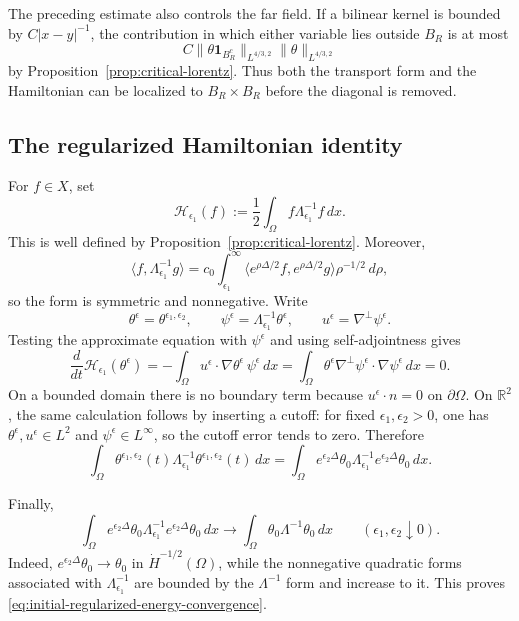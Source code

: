\documentclass[11pt,reqno]{amsproc}
\newcommand{\R}{\mathbb R}
\newcommand{\Om}{\Omega}
\newcommand{\one}{\mathbf 1}
\newcommand{\dd}{\,d}
\newcommand{\Lam}{\Lambda}
\begin{document}
The preceding estimate also controls the far field.  If a
bilinear kernel is bounded by $C|x-y|^{-1}$, the contribution in which either
variable lies outside $B_R$ is at most
\[
 C\|\theta\one_{B_R^c}\|_{L^{4/3,2}}
  \|\theta\|_{L^{4/3,2}}
\]
by Proposition~\ref{prop:critical-lorentz}.  Thus both the transport form and
the Hamiltonian can be localized to $B_R\times B_R$ before the diagonal is
removed.

\subsection{The regularized Hamiltonian identity}

For $f\in X$, set
\[
  \mathcal H_{\epsilon_1}(f)
  :=\frac12\int_\Om f\Lam_{\epsilon_1}^{-1}f\dd x.
\]
This is well defined by Proposition~\ref{prop:critical-lorentz}.  Moreover,
\[
 \langle f,\Lam_{\epsilon_1}^{-1}g\rangle
 =c_0\int_{\epsilon_1}^{\infty}
 \langle e^{\rho\Delta/2}f,e^{\rho\Delta/2}g\rangle
 \rho^{-1/2}\dd\rho,
\]
so the form is symmetric and nonnegative.  Write
\[
 \theta^\epsilon=\theta^{\epsilon_1,\epsilon_2},
 \qquad
 \psi^\epsilon=\Lam_{\epsilon_1}^{-1}\theta^\epsilon,
 \qquad
 u^\epsilon=\nabla^\perp\psi^\epsilon.
\]
Testing the approximate equation with $\psi^\epsilon$ and using
self-adjointness gives
\[
 \frac{d}{dt}\mathcal H_{\epsilon_1}(\theta^\epsilon)
 =-\int_\Om u^\epsilon\cdot\nabla\theta^\epsilon\,\psi^\epsilon\dd x
 =\int_\Om\theta^\epsilon
 \nabla^\perp\psi^\epsilon\cdot\nabla\psi^\epsilon\dd x=0.
\]
On a bounded domain there is no boundary term because
$u^\epsilon\cdot n=0$ on $\partial\Om$.  On $\R^2$, the same calculation
follows by inserting a cutoff: for fixed
$\epsilon_1,\epsilon_2>0$, one has
$\theta^\epsilon,u^\epsilon\in L^2$ and $\psi^\epsilon\in L^\infty$, so the
cutoff error tends to zero.  Therefore
\begin{equation}\label{eq:regularized-energy}
 \int_\Omega\theta^{\epsilon_1,\epsilon_2}(t)
 \Lam_{\epsilon_1}^{-1}\theta^{\epsilon_1,\epsilon_2}(t)\dd x
 =\int_\Omega e^{\epsilon_2\Delta}\theta_0
 \Lam_{\epsilon_1}^{-1}e^{\epsilon_2\Delta}\theta_0\dd x.
\end{equation}

Finally,
\begin{equation}\label{eq:initial-regularized-energy-convergence}
 \int_\Om e^{\epsilon_2\Delta}\theta_0
 \Lam_{\epsilon_1}^{-1}e^{\epsilon_2\Delta}\theta_0\dd x
 \longrightarrow
 \int_\Om\theta_0\Lam^{-1}\theta_0\dd x
 \qquad (\epsilon_1,\epsilon_2\downarrow0).
\end{equation}
Indeed, $e^{\epsilon_2\Delta}\theta_0\to\theta_0$ in
$\dot H^{-1/2}(\Om)$, while the nonnegative quadratic forms associated with
$\Lam_{\epsilon_1}^{-1}$ are bounded by the $\Lam^{-1}$ form and increase to
it.  This proves \eqref{eq:initial-regularized-energy-convergence}.
\end{document}
